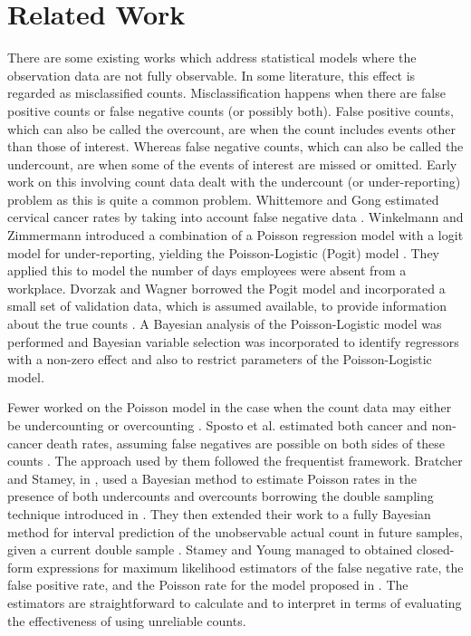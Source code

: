\section{Related Work}
\label{sec:related}

There are some existing works which address statistical models where the observation data are not fully observable. In some literature, this effect is regarded as misclassified counts. Misclassification happens when there are false positive counts or false negative counts (or possibly both). False positive counts, which can also be called the overcount, are when the count includes events other than those of interest. Whereas false negative counts, which can also be called the undercount, are when some of the events of interest are missed or omitted. Early work on this involving count data dealt with the undercount (or under-reporting) problem as this is quite a common problem. Whittemore and Gong estimated cervical cancer rates by taking into account false negative data \cite{whittemore1991}. Winkelmann and Zimmermann introduced a combination of a Poisson regression model with a logit model for under-reporting, yielding the Poisson-Logistic (Pogit) model \cite{winkelmann1993poisson}. They applied this to model the number of days employees were absent from a workplace. Dvorzak and Wagner borrowed the Pogit model and incorporated a small set of validation data, which is assumed available, to provide information about the true counts \cite{dvorzak2016}. A Bayesian analysis of the Poisson-Logistic model was performed and Bayesian variable selection was incorporated to identify regressors with a non-zero effect and also to restrict parameters of the Poisson-Logistic model.

Fewer worked on the Poisson model in the case when the count data may either be undercounting or overcounting \cite{sposto1992, bratcher2002, bratcher2004, stamey2005}. Sposto et al. estimated both cancer and non-cancer death rates, assuming false negatives are possible on both sides of these counts \cite{sposto1992}. The approach used by them followed the frequentist framework. Bratcher and Stamey, in \cite{bratcher2002}, used a Bayesian method to estimate Poisson rates in the presence of both undercounts and overcounts borrowing the double sampling technique introduced in \cite{Tenenbein1970}. They then extended their work to a fully Bayesian method for interval prediction of the unobservable actual count in future samples, given a current double sample \cite{bratcher2004}. Stamey and Young \cite{stamey2005} managed to obtained closed-form expressions for maximum likelihood estimators of the false negative rate, the false positive rate, and the Poisson rate for the model proposed in \cite{bratcher2002}. The estimators are straightforward to calculate and to interpret in terms of evaluating the effectiveness of using unreliable counts.

